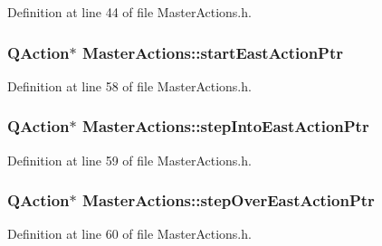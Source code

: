 Definition at line 44 of file Master\-Actions.\-h.

\hypertarget{class_master_actions_a8ea0090704403ea15decad4e0104feb8}{
\subsubsection[{start\-East\-Action\-Ptr}]{\setlength{\rightskip}{0pt plus 5cm}Q\-Action$\ast$ Master\-Actions\-::start\-East\-Action\-Ptr\hspace{0.3cm}{\ttfamily [private]}}}\label{class_master_actions_a8ea0090704403ea15decad4e0104feb8}


Definition at line 58 of file Master\-Actions.\-h.

\hypertarget{class_master_actions_acc473f35c8ee83c1d2d10d3a73522461}{
\subsubsection[{step\-Into\-East\-Action\-Ptr}]{\setlength{\rightskip}{0pt plus 5cm}Q\-Action$\ast$ Master\-Actions\-::step\-Into\-East\-Action\-Ptr\hspace{0.3cm}{\ttfamily [private]}}}\label{class_master_actions_acc473f35c8ee83c1d2d10d3a73522461}


Definition at line 59 of file Master\-Actions.\-h.

\hypertarget{class_master_actions_a2c51444dbd1ff60d23dd52cc6fb4a9f7}{
\subsubsection[{step\-Over\-East\-Action\-Ptr}]{\setlength{\rightskip}{0pt plus 5cm}Q\-Action$\ast$ Master\-Actions\-::step\-Over\-East\-Action\-Ptr\hspace{0.3cm}{\ttfamily [private]}}}\label{class_master_actions_a2c51444dbd1ff60d23dd52cc6fb4a9f7}


Definition at line 60 of file Master\-Actions.\-h.

